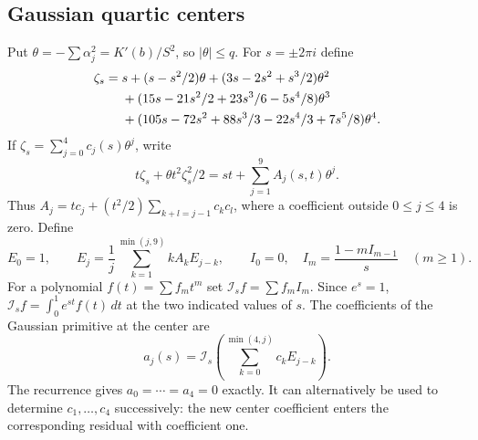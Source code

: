 \documentclass[11pt,reqno]{amsart}
\numberwithin{equation}{section}
\theoremstyle{definition}
\theoremstyle{remark}
\begin{document}
\subsection{Gaussian quartic centers}

Put $\theta=-\sum\alpha_j^2=K'(b)/S^2$, so $|\theta|\le q$.
For $s=\pm2\pi i$ define
\begin{align}
 \zeta_s={}&s+(s-s^2/2)\theta+(3s-2s^2+s^3/2)\theta^2\notag\\
 &+(15s-21s^2/2+23s^3/6-5s^4/8)\theta^3\notag\\
 &+(105s-72s^2+88s^3/3-22s^4/3+7s^5/8)\theta^4.
 \label{lt:gaussian-center}
\end{align}
If $\zeta_s=\sum_{j=0}^4c_j(s)\theta^j$, write
\[
 t\zeta_s+\theta t^2\zeta_s^2/2
       =st+\sum_{j=1}^9 A_j(s,t)\theta^j.
\]
Thus $A_j=tc_j+(t^2/2)\sum_{k+l=j-1}c_kc_l$, where a coefficient
outside $0\le j\le4$ is zero. Define
\[
 E_0=1,\qquad E_j=\frac1j\sum_{k=1}^{\min(j,9)}kA_kE_{j-k},
 \qquad I_0=0,\quad I_m=\frac{1-mI_{m-1}}s\quad(m\ge1).
\]
For a polynomial $f(t)=\sum f_mt^m$ set
$\mathcal I_s f=\sum f_m I_m$. Since $e^s=1$,
$\mathcal I_s f=\int_0^1e^{st}f(t)\,dt$ at the two indicated values
of $s$. The coefficients of the Gaussian primitive at the center are
\[
 a_j(s)=\mathcal I_s\left(\sum_{k=0}^{\min(4,j)}c_kE_{j-k}\right).
\]
The recurrence gives $a_0=\cdots=a_4=0$ exactly. It can alternatively
be used to determine $c_1,\ldots,c_4$ successively: the new center
coefficient enters the corresponding residual with coefficient one.
\end{document}
